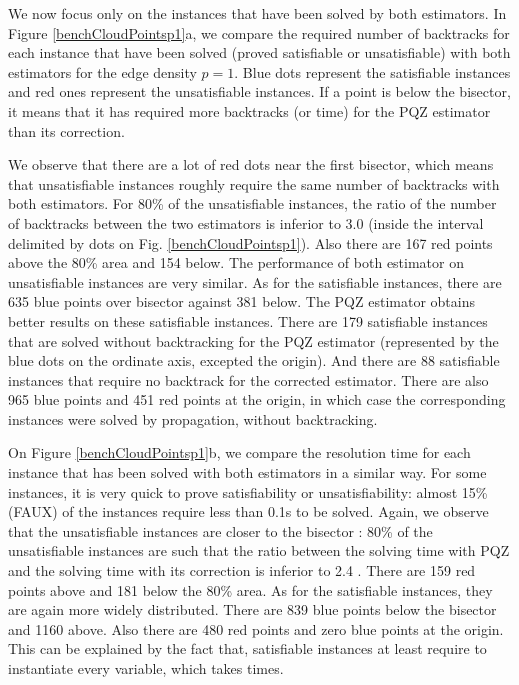\documentclass[jair,twoside,11pt,theapa]{article}
\begin{document}
%       
%       

We now focus only on the instances that have been solved by both estimators. In Figure \ref{benchCloudPointsp1}a, we compare the required number of backtracks for each instance that have been solved (proved satisfiable or unsatisfiable) with both estimators for the edge density $p=1$. Blue dots represent the satisfiable instances and red ones represent the unsatisfiable instances. If a point is below the bisector, it means that it has required more backtracks (or time) for the PQZ estimator than its correction. 

We observe that there are a lot of red dots near the first bisector, which means that unsatisfiable instances roughly require the same number of backtracks with both estimators. For 80\% of the unsatisfiable instances, the ratio of the number of backtracks between the two estimators is inferior to 3.0 (inside the interval delimited by dots on Fig. \ref{benchCloudPointsp1}). Also there are 167 red points above the 80\% area and 154 below. The performance of both estimator on unsatisfiable instances are very similar. As for the satisfiable instances, there are 635 blue points over bisector against 381 below. The PQZ estimator obtains better results on these satisfiable instances. There are 179 satisfiable instances that are solved without backtracking for the PQZ estimator (represented by the blue dots on the ordinate axis, excepted the origin). And there are 88 satisfiable instances that require no backtrack for the corrected estimator. There are also 965 blue points and 451 red points at the origin, in which case the corresponding instances were solved by propagation, without backtracking.

On Figure \ref{benchCloudPointsp1}b, we compare the resolution time for each instance that has been solved with both estimators in a similar way. For some instances, it is very quick to prove satisfiability or unsatisfiability: almost 15\% (FAUX) of the instances require less than 0.1s to be solved. Again, we  observe that the unsatisfiable instances are closer to the bisector : 80\% of the unsatisfiable instances are such that the ratio between the solving time with PQZ and the solving time with its correction is inferior to 2.4 . There are 159 red points above and 181 below the 80\% area. As for the satisfiable instances, they are again more widely distributed. There are 839 blue points below the bisector and 1160 above. Also there are 480 red points and zero blue points at the origin. This can be explained by the fact that, satisfiable instances at least require to instantiate  every variable, which takes times. 
\end{document}
